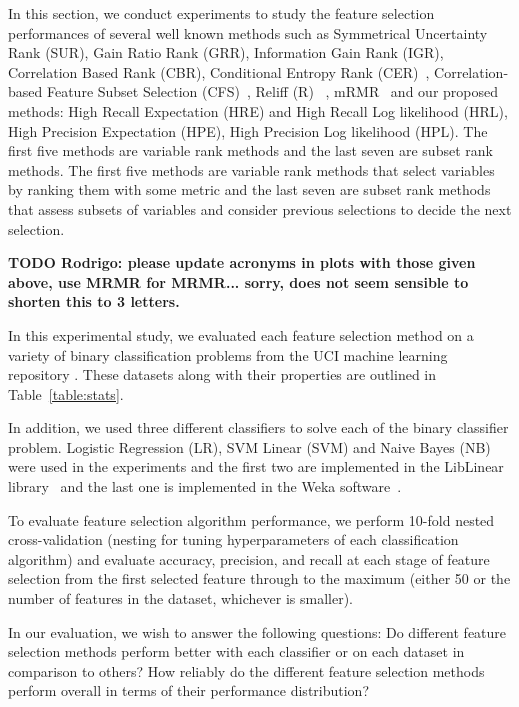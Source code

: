In this section, we conduct experiments to study the feature selection
performances of several well known methods such as Symmetrical
Uncertainty Rank (SUR), Gain Ratio Rank (GRR), Information Gain Rank
(IGR), Correlation Based Rank (CBR), Conditional Entropy Rank (CER)~\cite{guyon_jmlr03}, 
Correlation-based Feature Subset Selection (CFS)~\cite{Hall1998}, 
Reliff (R)~\cite{Robnik-Sikonja2003} , mRMR~\cite{peng2005} and our proposed 
methods: High Recall Expectation (HRE) and High Recall Log likelihood (HRL), 
High Precision Expectation (HPE), High Precision Log likelihood (HPL). 
The first five methods are variable rank methods and the last seven
are subset rank methods. The first five methods are variable rank methods that select variables by ranking them with some metric and the last seven are subset rank methods that assess subsets of variables and consider previous selections to decide the next selection.

{\bf TODO Rodrigo: please update acronyms in plots with those given above,
use MRMR for MRMR... sorry, does not seem sensible to shorten this to 3 letters.}


In this experimental study, we evaluated each feature selection
method on a variety of binary classification problems 
from the UCI machine learning repository \cite{Bache+Lichman:2013}.
These datasets along with their properties are outlined in 
Table~\ref{table:stats}.

In addition, we used three different classifiers to solve each of the
binary classifier problem. Logistic Regression (LR), SVM Linear (SVM) and Naive
Bayes (NB) were used in the experiments and the first two are implemented
in the LibLinear library~\cite{REF08a} and the last one is implemented in
the Weka software~\cite{weka}.
 
To evaluate feature selection algorithm performance, we perform 
10-fold nested cross-validation (nesting for tuning hyperparameters of each classification
algorithm) and evaluate accuracy, precision, and recall at each stage of
feature selection from the first selected feature through to the maximum
(either 50 or the number of features in the dataset, whichever is smaller).

In our evaluation, we wish to answer the following questions:
Do different feature selection methods perform better with
each classifier or on each dataset in comparison to others?
How reliably do the different feature selection methods perform overall
in terms of their performance distribution?

